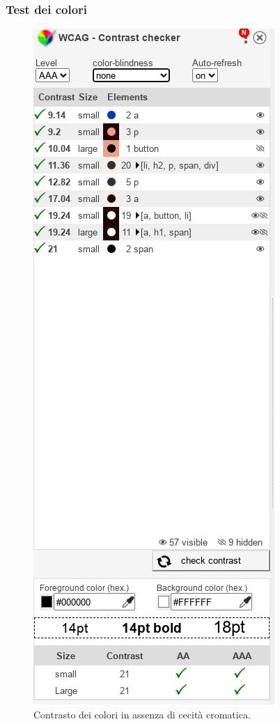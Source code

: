 \documentclass{template}
\begin{document}
	\subsubsection{Test dei colori}
	\begin{figure}[H]
		\centering
		\includegraphics[scale=0.7]{src/contrasti/none.png}
		\caption{Contrasto dei colori in assenza di cecità cromatica.}
	\end{figure}
\end{document}
